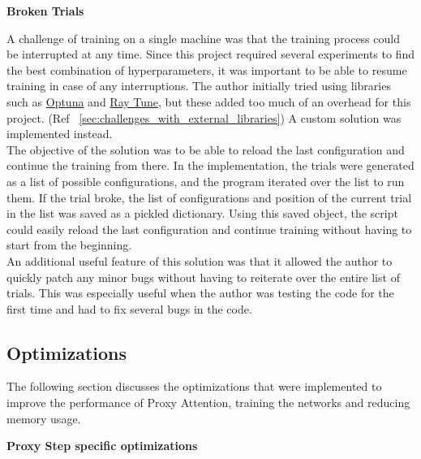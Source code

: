 \textbf{Broken Trials}

A challenge of training on a single machine was that the training process could be interrupted at any time. Since this project required several experiments to find the best combination of hyperparameters, it was important to be able to resume training in case of any interruptions. The author initially tried using libraries such as \href{https://github.com/optuna/optuna}{Optuna} and \href{https://github.com/ray-project/ray}{Ray Tune}, but these added too much of an overhead for this project. (Ref ~\ref{sec:challenges_with_external_libraries}) A custom solution was implemented instead.\\
The objective of the solution was to be able to reload the last configuration and continue the training from there. In the implementation, the trials were generated as a list of possible configurations, and the program iterated over the list to run them. If the trial broke, the list of configurations and position of the current trial in the list was saved as a pickled dictionary. Using this saved object, the script could easily reload the last configuration and continue training without having to start from the beginning.\\
An additional useful feature of this solution was that it allowed the author to quickly patch any minor bugs without having to reiterate over the entire list of trials. This was especially useful when the author was testing the code for the first time and had to fix several bugs in the code.

\subsection{Optimizations}
The following section discusses the optimizations that were implemented to improve the performance of Proxy Attention, training the networks and reducing memory usage.

\textbf{Proxy Step specific optimizations}


